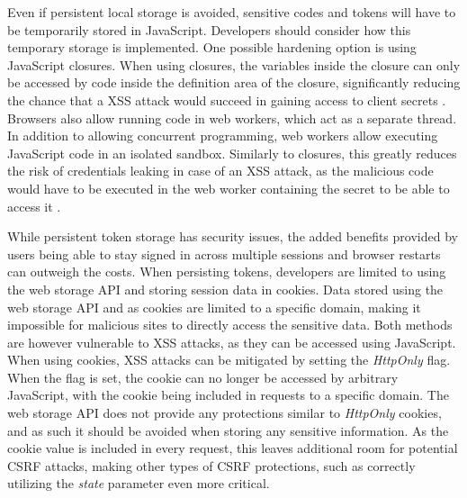 Even if persistent local storage is avoided, sensitive codes and tokens will have to be temporarily stored in JavaScript. 
Developers should consider how this temporary storage is implemented.
One possible hardening option is using JavaScript closures.
When using closures, the variables inside the closure can only be accessed by code inside the definition area of the closure, significantly reducing the chance that a XSS attack would succeed in gaining access to client secrets \citep{taly_automated_2011}.
Browsers also allow running code in web workers, which act as a separate thread.
In addition to allowing concurrent programming, web workers allow executing JavaScript code in an isolated sandbox.
Similarly to closures, this greatly reduces the risk of credentials leaking in case of an XSS attack, as the malicious code would have to be executed in the web worker containing the secret to be able to access it \citep{chinprutthiwong_security_2020}.

While persistent token storage has security issues, the added benefits provided by users being able to stay signed in across multiple sessions and browser restarts can outweigh the costs.
When persisting tokens, developers are limited to using the web storage API and storing session data in cookies.
Data stored using the web storage API and as cookies are limited to a specific domain, making it impossible for malicious sites to directly access the sensitive data.
Both methods are however vulnerable to XSS attacks, as they can be accessed using JavaScript.
When using cookies, XSS attacks can be mitigated by setting the \textit{HttpOnly} flag.
When the flag is set, the cookie can no longer be accessed by arbitrary JavaScript, with the cookie being included in requests to a specific domain.
The web storage API does not provide any protections similar to \textit{HttpOnly} cookies, and as such it should be avoided when storing any sensitive information.
As the cookie value is included in every request, this leaves additional room for potential CSRF attacks, making other types of CSRF protections, such as correctly utilizing the \textit{state} parameter even more critical.